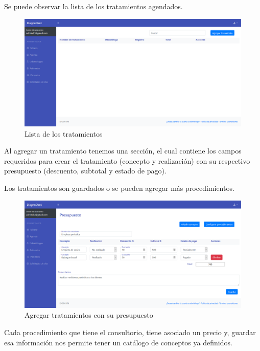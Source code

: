 Se puede observar la lista de los tratamientos agendados.

\begin{figure}[H]
\centering
\includegraphics[width=17cm,keepaspectratio]{pictures/adminodo/pacientes/presupuestos/lista-tratamientos-vacia.png}
\caption{Lista de los tratamientos}
\end{figure}

Al agregar un tratamiento tenemos una sección, el cual contiene los campos requeridos para crear el tratamiento (concepto y realización) con su respectivo presupuesto (descuento, subtotal y estado de pago).

\vspace{1em}

Los tratamientos son guardados o se pueden agregar más procedimientos.

\begin{figure}[H]
\centering
\includegraphics[width=17cm,keepaspectratio]{pictures/adminodo/pacientes/presupuestos/agregar-tratamientos-conceptos.png}
\caption{Agregar tratamientos con su presupuesto}
\end{figure}

Cada procedimiento que tiene el consultorio, tiene asociado un precio y, guardar esa información nos permite tener un catálogo de conceptos ya definidos.

